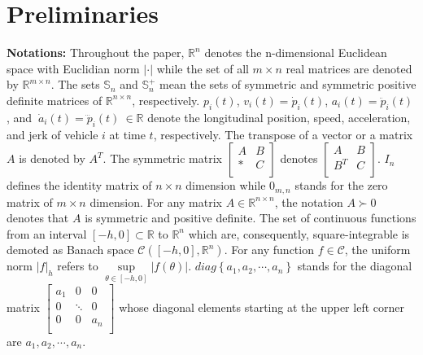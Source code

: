 \documentclass[a4paper]{cas-sc}
\begin{document}


\section{Preliminaries}
\label{Section 2}


\textbf{Notations:} Throughout the paper, $\mathbb{R}^n$ denotes the n-dimensional Euclidean space with Euclidian norm $|\cdot|$ while the set of all $m\times n$ real matrices are denoted by $\mathbb{R}^{m\times n}$. The sets $\mathbb{S}_n$ and $\mathbb{S}_n^+$ mean the sets of symmetric and symmetric positive definite matrices of $\mathbb{R}^{n\times n}$, respectively. $p_i\left(t\right)$, $v_i\left(t\right)={\dot{p}}_i\left(t\right)$, $a_i\left(t\right)={\ddot{p}}_i\left(t\right)$, and $\ {\dot{a}}_i\left(t\right)={\dddot{p}}_i\left(t\right)\ \in\mathbb{R}$ denote the longitudinal position, speed, acceleration, and jerk of vehicle $i$ at time $t$, respectively. The transpose of a vector or a matrix $A$ is denoted by $A^T$. The symmetric matrix $\left[\begin{matrix}A&B\\\ast&C\\\end{matrix}\right]$ denotes $\left[\begin{matrix}A&B\\B^T&C\\\end{matrix}\right]$. $I_n$ defines the identity matrix of $n\times n$ dimension while $0_{m,n}$ stands for the zero matrix of $m\times n$ dimension. For any matrix $A\in\mathbb{R}^{n\times n}$, the notation $A\succ0$ denotes that $A$ is symmetric and positive definite. The set of continuous functions from an interval $\left[ { - h,0} \right] \subset \mathbb{R}$ to ${\mathbb{R}^n}$ which are, consequently, square-integrable is demoted as Banach space $\mathcal{C} \left(\left[-h,0\right],\mathbb{R}^n\right)$. For any function $f\in\mathcal{C}$, the uniform norm $|f|_h$ refers to $\mathop {\sup }\limits_{\theta  \in [ - h,0]} |f(\theta )|$. $diag\left\{a_1,a_2,\cdots,a_n\right\}$ stands for the diagonal matrix $\left[\begin{matrix}a_1&0&0\\0&\ddots&0\\0&0&a_n\\\end{matrix}\right]$ whose diagonal elements starting at the upper left corner are $a_1,a_2,\cdots,a_n$.
\end{document}
